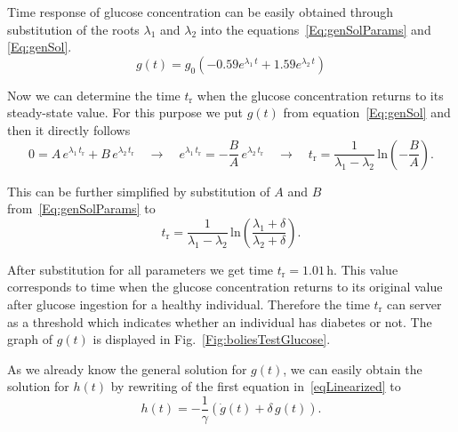 \documentclass{article}
\providecommand{\m}[1]{\ensuremath{\mathrm{#1}}}
\begin{document}
Time response of glucose concentration can be easily obtained through substitution of the roots $\lambda_1$ and $\lambda_2$ into the equations~\eqref{Eq:genSolParams} and \eqref{Eq:genSol}.
\begin{equation}
	g(t) = g_0 \left( -0.59 e^{\lambda_1\,t} + 1.59 e^{\lambda_2\,t} \right)
\end{equation}

Now we can determine the time $t_\m{r}$ when the glucose concentration returns to its steady-state value. For this purpose we put $g(t)$ from equation~\eqref{Eq:genSol} and then it directly follows
\begin{equation*}
	0 = A\,e^{\lambda_1 \, t_\m{r}} + B\,e^{\lambda_2 \, t_\m{r}}		\quad\to\quad
	e^{\lambda_1\,t_\m{r}} = -\frac{B}{A}\,e^{\lambda_2\,t_\m{r}} 	\quad\to\quad
	t_\m{r} = \frac{1}{\lambda_1 - \lambda_2}\,\m{ln}\left(-\frac{B}{A}\right).
\end{equation*}


This can be further simplified by substitution of $A$ and $B$ from~\eqref{Eq:genSolParams} to
\begin{equation}
	t_\m{r} = \frac{1}{\lambda_1 - \lambda_2}\,\m{ln}\left(\frac{\lambda_1+\delta}{\lambda_2+\delta}\right).
\end{equation}

After substitution for all parameters we get time $t_\m{r}=1.01\,\si{\hour}$. This value corresponds to time when the glucose concentration returns to its original value after glucose ingestion for a healthy individual. Therefore the time $t_\m{r}$ can server as a threshold which indicates whether an individual has diabetes or not. The graph of $g(t)$ is displayed in Fig.~\ref{Fig:boliesTestGlucose}.

As we already know the general solution for $g(t)$, we can easily obtain the solution for $h(t)$ by rewriting of the first equation in~\eqref{eqLinearized} to
\begin{equation}
	h(t) = -\frac{1}{\gamma}\left( \dot{g}(t) + \delta\,g(t)\right).
\end{equation}
\end{document}
